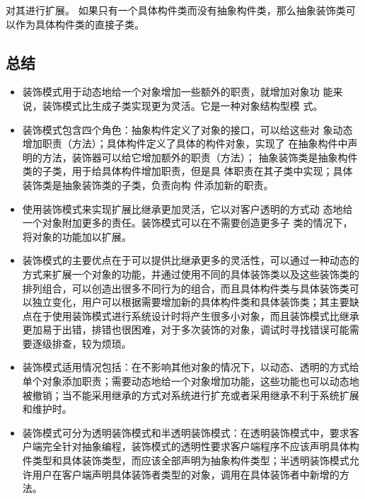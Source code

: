 \documentclass[letterpaper,10pt,english]{sphinxmanual}
\begin{document}
\sphinxAtStartPar
对其进行扩展。
\sphinxhyphen{} 如果只有一个具体构件类而没有抽象构件类，那么抽象装饰类可以作为具体构件类的直接子类。


\subsection{总结}
\label{\detokenize{structural_patterns/decorator:id15}}\begin{itemize}
\item {} 
\sphinxAtStartPar
装饰模式用于动态地给一个对象增加一些额外的职责，就增加对象功 能来说，装饰模式比生成子类实现更为灵活。它是一种对象结构型模 式。

\item {} 
\sphinxAtStartPar
装饰模式包含四个角色：抽象构件定义了对象的接口，可以给这些对 象动态增加职责（方法）；具体构件定义了具体的构件对象，实现了 在抽象构件中声明的方法，装饰器可以给它增加额外的职责（方法）； 抽象装饰类是抽象构件类的子类，用于给具体构件增加职责，但是具 体职责在其子类中实现；具体装饰类是抽象装饰类的子类，负责向构 件添加新的职责。

\item {} 
\sphinxAtStartPar
使用装饰模式来实现扩展比继承更加灵活，它以对客户透明的方式动 态地给一个对象附加更多的责任。装饰模式可以在不需要创造更多子 类的情况下，将对象的功能加以扩展。

\item {} 
\sphinxAtStartPar
装饰模式的主要优点在于可以提供比继承更多的灵活性，可以通过一种动态的 方式来扩展一个对象的功能，并通过使用不同的具体装饰类以及这些装饰类的 排列组合，可以创造出很多不同行为的组合，而且具体构件类与具体装饰类可 以独立变化，用户可以根据需要增加新的具体构件类和具体装饰类；其主要缺 点在于使用装饰模式进行系统设计时将产生很多小对象，而且装饰模式比继承 更加易于出错，排错也很困难，对于多次装饰的对象，调试时寻找错误可能需 要逐级排查，较为烦琐。

\item {} 
\sphinxAtStartPar
装饰模式适用情况包括：在不影响其他对象的情况下，以动态、透明的方式给 单个对象添加职责；需要动态地给一个对象增加功能，这些功能也可以动态地 被撤销；当不能采用继承的方式对系统进行扩充或者采用继承不利于系统扩展 和维护时。

\item {} 
\sphinxAtStartPar
装饰模式可分为透明装饰模式和半透明装饰模式：在透明装饰模式中，要求客 户端完全针对抽象编程，装饰模式的透明性要求客户端程序不应该声明具体构 件类型和具体装饰类型，而应该全部声明为抽象构件类型；半透明装饰模式允 许用户在客户端声明具体装饰者类型的对象，调用在具体装饰者中新增的方法。

\end{itemize}
\end{document}
